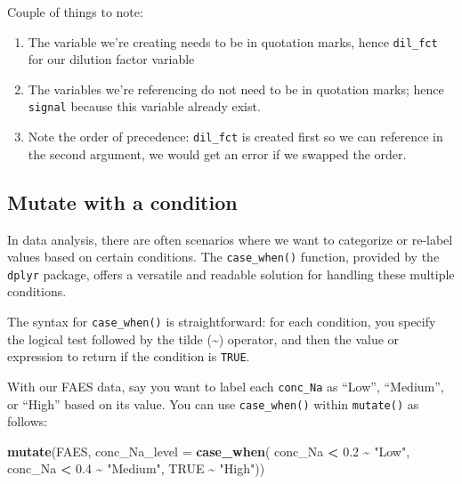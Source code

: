 \documentclass[
]{book}
\newenvironment{Shaded}{\begin{snugshade}}{\end{snugshade}}
\newcommand{\AttributeTok}[1]{\textcolor[rgb]{0.13,0.29,0.53}{#1}}
\newcommand{\ConstantTok}[1]{\textcolor[rgb]{0.56,0.35,0.01}{#1}}
\newcommand{\FloatTok}[1]{\textcolor[rgb]{0.00,0.00,0.81}{#1}}
\newcommand{\FunctionTok}[1]{\textcolor[rgb]{0.13,0.29,0.53}{\textbf{#1}}}
\newcommand{\NormalTok}[1]{#1}
\newcommand{\SpecialCharTok}[1]{\textcolor[rgb]{0.81,0.36,0.00}{\textbf{#1}}}
\newcommand{\StringTok}[1]{\textcolor[rgb]{0.31,0.60,0.02}{#1}}
\providecommand{\tightlist}{%
  \setlength{\itemsep}{0pt}\setlength{\parskip}{0pt}}
\begin{document}
Couple of things to note:

\begin{enumerate}
\def\labelenumi{\arabic{enumi}.}
\tightlist
\item
  The variable we're creating needs to be in quotation marks, hence \texttt{dil\_fct} for our dilution factor variable
\item
  The variables we're referencing do not need to be in quotation marks; hence \texttt{signal} because this variable already exist.
\item
  Note the order of precedence: \texttt{dil\_fct} is created first so we can reference in the second argument, we would get an error if we swapped the order.
\end{enumerate}

\hypertarget{mutate-with-a-condition}{%
\subsection{Mutate with a condition}\label{mutate-with-a-condition}}

In data analysis, there are often scenarios where we want to categorize or re-label values based on certain conditions. The \texttt{case\_when()} function, provided by the \texttt{dplyr} package, offers a versatile and readable solution for handling these multiple conditions.

The syntax for \texttt{case\_when()} is straightforward: for each condition, you specify the logical test followed by the tilde (\textasciitilde) operator, and then the value or expression to return if the condition is \texttt{TRUE}.

With our FAES data, say you want to label each \texttt{conc\_Na} as ``Low'', ``Medium'', or ``High'' based on its value. You can use \texttt{case\_when()} within \texttt{mutate()} as follows:

\begin{Shaded}
\begin{Highlighting}[]
\FunctionTok{mutate}\NormalTok{(FAES, }
       \AttributeTok{conc\_Na\_level =} \FunctionTok{case\_when}\NormalTok{(}
\NormalTok{         conc\_Na }\SpecialCharTok{\textless{}} \FloatTok{0.2} \SpecialCharTok{\textasciitilde{}} \StringTok{"Low"}\NormalTok{,}
\NormalTok{         conc\_Na }\SpecialCharTok{\textless{}} \FloatTok{0.4} \SpecialCharTok{\textasciitilde{}} \StringTok{"Medium"}\NormalTok{,}
         \ConstantTok{TRUE} \SpecialCharTok{\textasciitilde{}} \StringTok{"High"}\NormalTok{))}
\end{Highlighting}
\end{Shaded}
\end{document}
